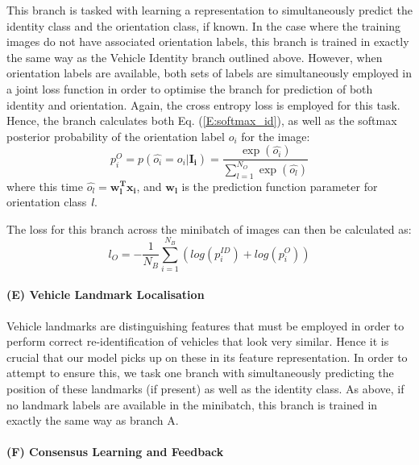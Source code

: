\documentclass[10pt,twocolumn,letterpaper]{article}
\begin{document}
This branch is tasked with learning a representation to simultaneously predict the identity class and the orientation class, if known. In the case where the training images do not have associated orientation labels, this branch is trained in exactly the same way as the Vehicle Identity branch outlined above. However, when orientation labels are available, both sets of labels are simultaneously employed in a joint loss function in order to optimise the branch for prediction of both identity and orientation. Again, the cross entropy loss is employed for this task. Hence, the branch calculates both Eq. (\ref{E:softmax_id}), as well as the softmax posterior probability of the orientation label $o_i$ for the image:
\begin{equation}
  p_i^{O} = p(\hat{o_i} = o_i|\mathbf{I_i}) = \frac{\exp(\hat{o_i})}{\sum_{l=1}^{N_{O}}\exp(\hat{o_l})}
\end{equation}
where this time $\hat{o_l} = \mathbf{w_l^Tx_i}$, and $\mathbf{w_l}$ is the prediction function parameter for orientation class $\emph{l}$.

The loss for this branch across the minibatch of images can then be calculated as:
\begin{equation}
  l_{O} = -\frac{1}{N_B} \sum_{i=1}^{N_B}( log(p_i^{ID}) + log(p_i^{O}))
\end{equation}

\paragraph{(E) Vehicle Landmark Localisation}

Vehicle landmarks are distinguishing features that must be employed in order to perform correct  re-identification of vehicles that look very similar. Hence it is crucial that our model picks up on these in its feature representation. In order to attempt to ensure this, we task one branch with simultaneously predicting the position of these landmarks (if present) as well as the identity class. As above, if no landmark labels are available in the minibatch, this branch is trained in exactly the same way as branch A.

\paragraph{(F) Consensus Learning and Feedback}
\end{document}
